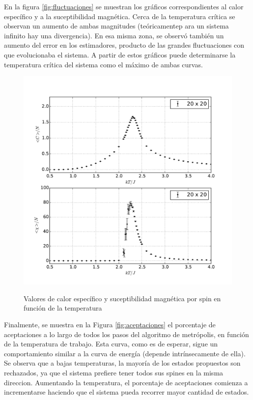 \documentclass[a4paper,12pt]{article}
\begin{document}
En la figura \eqref{fig:fluctuaciones} se muestran los gráficos 
correspondientes al calor específico y a la suceptibilidad magnética. Cerca de 
la temperatura crítica se observan un aumento de ambas magnitudes 
(teóricamentep ara un sistema infinito hay una divergencia). En esa misma zona, 
se observó también un aumento del error en los estimadores, producto de las 
grandes fluctuaciones con que evolucionaba el sistema. A partir de estos 
gráficos puede determinarse la temperatura crítica del sistema como el máximo 
de ambas curvas.

\begin{figure}[H]
    \begin{center}
      \includegraphics[scale=0.7]{fluctuaciones.pdf} \\
      \caption{Valores de calor específico y suceptibilidad magnética por spin 
      en función de la temperatura} \label{fig:fluctuaciones}
    \end{center}
\end{figure}

Finalmente, se muestra en la Figura \eqref{fig:aceptaciones} el porcentaje de 
aceptaciones a lo largo de todos los pasos del algoritmo de metrópolis, en 
función de la temperatura de trabajo. Esta curva, como es de esperar, sigue un 
comportamiento similar a la curva de energía (depende intrínsecamente de ella). 
Se observa que a bajas temperaturas, la mayoría de los estados propuestos son 
rechazados, ya que el sistema prefiere tener todos sus spines en la misma 
direccion. Aumentando la temperatura, el porcentaje de aceptaciones comienza a 
incrementarse haciendo que el sistema pueda recorrer mayor cantidad de estados.
\end{document}
